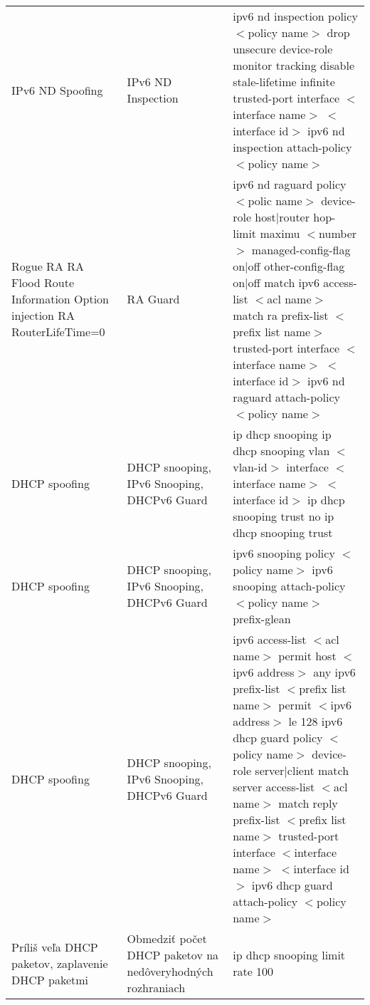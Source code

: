 \begin{longtable}[!htbp]{|L{10em}L{10em}L{34em}|}
	
	
	
	IPv6 ND Spoofing	&IPv6 ND Inspection	&ipv6 nd inspection policy $<$policy name$>$
	drop unsecure
	device-role monitor
	tracking disable stale-lifetime infinite
	trusted-port
	interface $<$interface name$>$ $<$interface id$>$
	ipv6 nd inspection attach-policy  $<$policy name$>$\\
	
	
	
	 Rogue RA
	RA Flood
	Route Information Option injection
	RA RouterLifeTime=0
	&RA Guard	&ipv6 nd raguard policy $<$polic name$>$
	device-role host|router
	hop-limit maximu $<$number$>$
	managed-config-flag on|off
	other-config-flag on|off
	match ipv6 access-list $<$acl name$>$
	match ra prefix-list $<$prefix list name$>$
	trusted-port
	interface $<$interface name$>$ $<$interface id$>$
	ipv6 nd raguard attach-policy $<$policy name$>$\\
	
	
	
	
	DHCP spoofing	&DHCP snooping, IPv6 Snooping, DHCPv6 Guard	&ip dhcp snooping
	ip dhcp snooping vlan $<$vlan-id$>$ 
	interface $<$interface name$>$ $<$interface id$>$
	ip dhcp snooping trust
	no ip dhcp snooping trust\\
	
	
	
	
	 DHCP spoofing	&DHCP snooping, IPv6 Snooping, DHCPv6 Guard	&ipv6 snooping policy $<$policy name$>$
	ipv6 snooping attach-policy $<$policy name$>$
	prefix-glean\\
	
	
	
	DHCP spoofing	&DHCP snooping, IPv6 Snooping, DHCPv6 Guard	&ipv6 access-list $<$acl name$>$
	permit host $<$ipv6 address$>$ any
	ipv6 prefix-list $<$prefix list name$>$ permit $<$ipv6 address$>$  le 128
	ipv6 dhcp guard policy $<$policy name$>$
	device-role server|client
	match server access-list $<$acl name$>$
	match reply prefix-list $<$prefix list name$>$
	trusted-port
	interface $<$interface name$>$ $<$interface id$>$
	ipv6 dhcp guard attach-policy $<$policy name$>$\\
	
	
	
	
	 Príliš veľa DHCP paketov, zaplavenie DHCP paketmi	&Obmedziť počet DHCP paketov na nedôveryhodných rozhraniach	&ip dhcp snooping limit rate 100 \\
	
	
	

\end{longtable}
